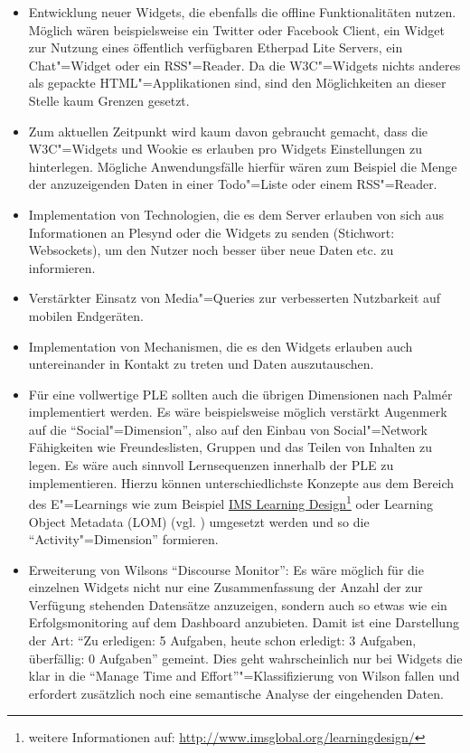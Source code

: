 \begin{itemize}
 \item Entwicklung neuer Widgets, die ebenfalls die offline Funktionalitäten nutzen. Möglich wären beispielsweise ein Twitter oder Facebook Client, ein Widget zur Nutzung eines öffentlich verfügbaren Etherpad Lite Servers, ein Chat"=Widget oder ein RSS"=Reader. Da die W3C"=Widgets nichts anderes als gepackte HTML"=Applikationen sind, sind den Möglichkeiten an dieser Stelle kaum Grenzen gesetzt.
 \item Zum aktuellen Zeitpunkt wird kaum davon gebraucht gemacht, dass die W3C"=Widgets und Wookie es erlauben pro Widgets Einstellungen zu hinterlegen. Mögliche Anwendungsfälle hierfür wären zum Beispiel die Menge der anzuzeigenden Daten in einer Todo"=Liste oder einem RSS"=Reader.
 \item Implementation von Technologien, die es dem Server erlauben von sich aus Informationen an Plesynd oder die Widgets zu senden (Stichwort: Websockets), um den Nutzer noch besser über neue Daten etc. zu informieren.
 \item Verstärkter Einsatz von Media"=Queries zur verbesserten Nutzbarkeit auf mobilen Endgeräten.
 \item Implementation von Mechanismen, die es den Widgets erlauben auch untereinander in Kontakt zu treten und Daten auszutauschen.
 \item Für eine vollwertige PLE sollten auch die übrigen Dimensionen nach Palmér implementiert werden. Es wäre beispielsweise möglich verstärkt Augenmerk auf die "`Social"=Dimension"', also auf den Einbau von Social"=Network Fähigkeiten wie Freundeslisten, Gruppen und das Teilen von Inhalten zu legen. Es wäre auch sinnvoll Lernsequenzen innerhalb der PLE zu implementieren. Hierzu können unterschiedlichste Konzepte aus dem Bereich des E"=Learnings wie zum Beispiel \href{http://www.imsglobal.org/learningdesign/}{IMS Learning Design}\footnote{weitere Informationen auf: \url{http://www.imsglobal.org/learningdesign/}} oder Learning Object Metadata (LOM) (vgl. \cite{LOM2002}) umgesetzt werden und so die "`Activity"=Dimension"' formieren.
 \item Erweiterung von Wilsons "`Discourse Monitor"': Es wäre möglich für die einzelnen Widgets nicht nur eine Zusammenfassung der Anzahl der zur Verfügung stehenden Datensätze anzuzeigen, sondern auch so etwas wie ein Erfolgsmonitoring auf dem Dashboard anzubieten. Damit ist eine Darstellung der Art: "`Zu erledigen: 5 Aufgaben, heute schon erledigt: 3 Aufgaben, überfällig: 0 Aufgaben"' gemeint. Dies geht wahrscheinlich nur bei Widgets die klar in die “Manage Time and Effort”"=Klassifizierung von Wilson fallen und erfordert zusätzlich noch eine semantische Analyse der eingehenden Daten.
\end{itemize}

